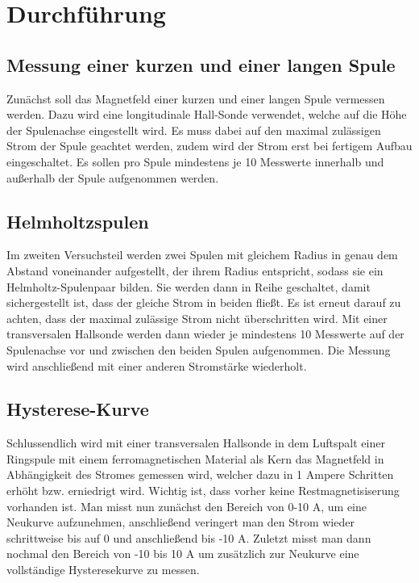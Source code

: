 \section{Durchführung}
\subsection{Messung einer kurzen und einer langen Spule}
Zunächst soll das Magnetfeld einer kurzen und einer langen Spule vermessen werden.
Dazu wird eine longitudinale Hall-Sonde verwendet, welche auf die Höhe der
Spulenachse eingestellt wird. Es muss dabei auf den maximal zulässigen Strom der Spule
geachtet werden, zudem wird der Strom erst bei fertigem Aufbau eingeschaltet.
Es sollen pro Spule mindestens je 10 Messwerte innerhalb und außerhalb der Spule
aufgenommen werden.

\subsection{Helmholtzspulen}
Im zweiten Versuchsteil werden zwei Spulen mit gleichem Radius in genau dem Abstand voneinander
aufgestellt, der ihrem Radius entspricht, sodass sie ein Helmholtz-Spulenpaar bilden.
Sie werden dann in Reihe geschaltet, damit sichergestellt ist, dass der gleiche
Strom in beiden fließt. Es ist erneut darauf zu achten, dass der maximal zulässige Strom
nicht überschritten wird.
Mit einer transversalen Hallsonde werden dann wieder je mindestens 10 Messwerte
auf der Spulenachse vor und zwischen den beiden Spulen aufgenommen.
Die Messung wird anschließend mit einer anderen Stromstärke wiederholt.

\subsection{Hysterese-Kurve}
Schlussendlich wird mit einer transversalen Hallsonde in dem Luftspalt einer Ringspule
mit einem ferromagnetischen Material als Kern das Magnetfeld in Abhängigkeit des
Stromes gemessen wird, welcher dazu in 1 Ampere Schritten erhöht bzw. erniedrigt wird.
Wichtig ist, dass vorher keine Restmagnetisiserung vorhanden ist.
Man misst nun zunächst den Bereich von 0-10 A, um eine Neukurve aufzunehmen, anschließend
veringert man den Strom wieder schrittweise bis auf 0 und anschließend bis -10 A.
Zuletzt misst man dann nochmal den Bereich von -10 bis 10 A um zusätzlich zur Neukurve eine
vollständige Hysteresekurve zu messen.
